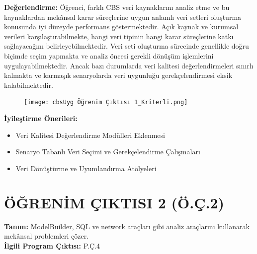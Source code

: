 \documentclass[12pt,a4paper]{article}
\begin{document}
\vspace{0.5cm}
\textbf{Değerlendirme:}
Öğrenci, farklı CBS veri kaynaklarını analiz etme ve bu kaynaklardan mekânsal karar süreçlerine uygun anlamlı veri setleri oluşturma konusunda iyi düzeyde performans göstermektedir. Açık kaynak ve kurumsal verileri karşılaştırabilmekte, hangi veri tipinin hangi karar süreçlerine katkı sağlayacağını belirleyebilmektedir. Veri seti oluşturma sürecinde genellikle doğru biçimde seçim yapmakta ve analiz öncesi gerekli dönüşüm işlemlerini uygulayabilmektedir. Ancak bazı durumlarda veri kalitesi değerlendirmeleri sınırlı kalmakta ve karmaşık senaryolarda veri uygunluğu gerekçelendirmesi eksik kalabilmektedir.

\begin{figure}[H]
 \centering
 \texttt{[image: cbsUyg Öğrenim Çıktısı 1\_Kriterli.png]} %
\end{figure}

\textbf{İyileştirme Önerileri:}
\begin{itemize}
    \item Veri Kalitesi Değerlendirme Modülleri Eklenmesi
    \item Senaryo Tabanlı Veri Seçimi ve Gerekçelendirme Çalışmaları
    \item Veri Dönüştürme ve Uyumlandırma Atölyeleri
\end{itemize}

\newpage

\section*{ÖĞRENİM ÇIKTISI 2 (Ö.Ç.2)}
\textbf{Tanım:} ModelBuilder, SQL ve network araçları gibi analiz araçlarını kullanarak mekânsal problemleri çözer.\\
\textbf{İlgili Program Çıktısı:} P.Ç.4
\end{document}
